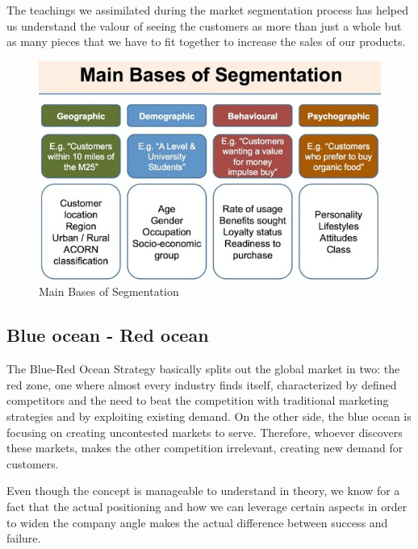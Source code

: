 \documentclass[12p]{article}
\begin{document}
The teachings we assimilated during the market segmentation process has helped us understand the valour of seeing the customers as more than just a whole but as many pieces that we have to fit together to increase the sales of our products.

\begin{figure}
    \centering
    \includegraphics[width=1\textwidth]{market_segmentation}
    \caption{Main Bases of Segmentation \cite{MarketSegmentationBases}}
\end{figure}

\newpage


\subsection{Blue ocean - Red ocean} \label{BlueOceanRedOcean}

The Blue-Red Ocean Strategy basically splits out the global market in two: the red zone, one where almost every industry finds itself, characterized by defined competitors and the need to beat the competition with traditional marketing strategies and by exploiting existing demand.
On the other side, the blue ocean is focusing on creating uncontested markets to serve. Therefore, whoever discovers these markets, makes the other competition irrelevant, creating new demand for customers.\cite{BlueOceanRedOcean}

Even though the concept is manageable to understand in theory, we know for a fact that the actual positioning and how we can leverage certain aspects in order to widen the company angle makes the actual difference between success and failure.
\end{document}
